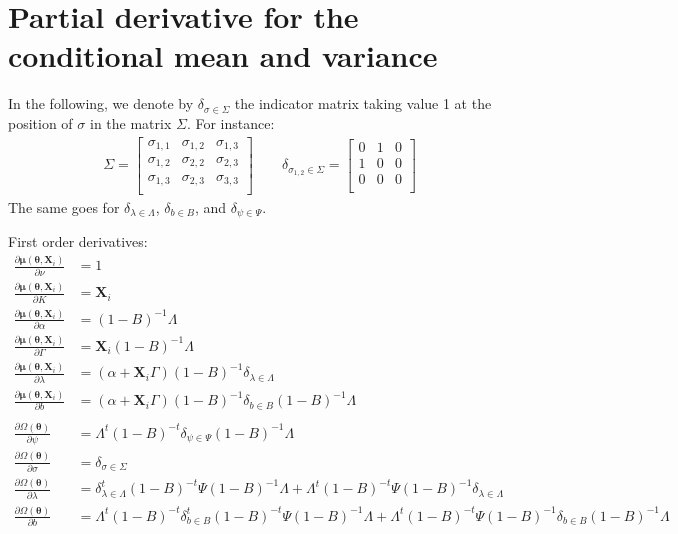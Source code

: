 \documentclass[table]{article}
\newcommand{\VX}{\boldsymbol{X}}
\newcommand{\Vmu}{\boldsymbol{\mu}}
\newcommand{\param}{\theta}
\newcommand{\Vparam}{\boldsymbol{\param}}
\begin{document}
\section{Partial derivative for the conditional mean and variance}
\label{sec:orgef944c3}

In the following, we denote by \(\delta_{\sigma \in \Sigma}\) the
indicator matrix taking value 1 at the position of \(\sigma\) in the
matrix \(\Sigma\). For instance:
\begin{align*}
\Sigma =
\begin{bmatrix}
 \sigma_{1,1} & \sigma_{1,2} & \sigma_{1,3} \\
 \sigma_{1,2} & \sigma_{2,2} & \sigma_{2,3} \\
 \sigma_{1,3} & \sigma_{2,3} & \sigma_{3,3} \\
\end{bmatrix}
 \qquad 
\delta_{\sigma_{1,2} \in \Sigma} =
\begin{bmatrix}
0 & 1 & 0 \\
1 & 0 & 0 \\
0 & 0 & 0 \\
\end{bmatrix}
\end{align*}
The same goes for \(\delta_{\lambda \in \Lambda}\), \(\delta_{b \in
B}\), and \(\delta_{\psi \in \Psi}\). 

\bigskip

First order derivatives:
\begin{align*}
 \frac{\partial \Vmu(\Vparam,\VX_i)}{\partial \nu} &= 1 \\
 \frac{\partial \Vmu(\Vparam,\VX_i)}{\partial K} &= \VX_i \\
 \frac{\partial \Vmu(\Vparam,\VX_i)}{\partial \alpha} &= (1-B)^{-1}\Lambda \\
 \frac{\partial \Vmu(\Vparam,\VX_i)}{\partial \Gamma} &= \VX_i(1-B)^{-1}\Lambda \\
 \frac{\partial \Vmu(\Vparam,\VX_i)}{\partial \lambda} &= (\alpha + \VX_i \Gamma)(1-B)^{-1}\delta_{\lambda \in \Lambda} \\
 \frac{\partial \Vmu(\Vparam,\VX_i)}{\partial b} &= (\alpha + \VX_i \Gamma)(1-B)^{-1}\delta_{b \in B}(1-B)^{-1}\Lambda \\
 &\\
 \frac{\partial \Omega(\Vparam)}{\partial \psi} &= \Lambda^t (1-B)^{-t} \delta_{\psi \in \Psi} (1-B)^{-1} \Lambda \\
 \frac{\partial \Omega(\Vparam)}{\partial \sigma} &= \delta_{\sigma \in \Sigma} \\
 \frac{\partial \Omega(\Vparam)}{\partial \lambda} &= \delta_{\lambda \in \Lambda}^t (1-B)^{-t} \Psi (1-B)^{-1} \Lambda + \Lambda^t (1-B)^{-t} \Psi (1-B)^{-1} \delta_{\lambda \in \Lambda} \\
 \frac{\partial \Omega(\Vparam)}{\partial b} &= \Lambda^t (1-B)^{-t} \delta_{b \in B}^t (1-B)^{-t} \Psi (1-B)^{-1} \Lambda + \Lambda^t (1-B)^{-t} \Psi (1-B)^{-1} \delta_{b \in B} (1-B)^{-1} \Lambda\\
\end{align*}
\end{document}
